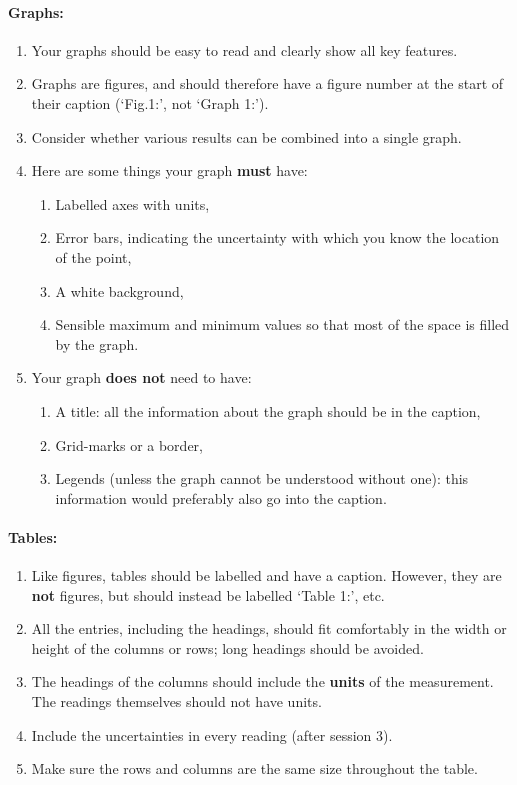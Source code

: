 \paragraph{Graphs:}
\begin{enumerate}
    \item Your graphs should be easy to read and clearly show all key features.
    \item Graphs are figures, and should therefore have a figure number at the start of their caption (`Fig.1:', not `Graph 1:').
    \item Consider whether various results can be combined into a single graph.
    \item Here are some things your graph \textbf{must} have:
    
    \begin{enumerate}
        \item Labelled axes with units,
        \item Error bars, indicating the uncertainty with which you know the location of the point,
        \item A white background,
        \item Sensible maximum and minimum values so that most of the space is filled by the graph.
    \end{enumerate}
    
    \item Your graph \textbf{does not} need to have:
    
    \begin{enumerate}
        \item A title: all the information about the graph should be in the caption,
        \item Grid-marks or a border,
        \item Legends (unless the graph cannot be understood without one): this information would preferably also go into the caption.
    \end{enumerate}

\end{enumerate}


\paragraph{Tables:}

\begin{enumerate}
    \item Like figures, tables should be labelled and have a caption. However, they are \textbf{not} figures, but should instead be labelled `Table 1:', etc.
    \item All the entries, including the headings, should fit comfortably in the width or height of the columns or rows; long headings should be avoided. 
    \item The headings of the columns should include the \textbf{units} of the measurement. The readings themselves should not have units.
    \item Include the uncertainties in every reading (after session 3).
    \item Make sure the rows and columns are the same size throughout the table.
\end{enumerate}

